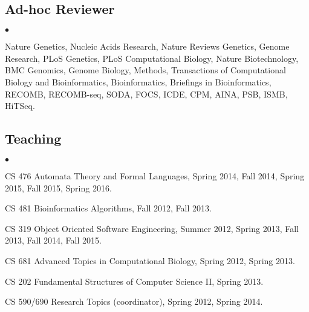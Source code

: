 \documentclass[margin,line]{res}
\newenvironment{list2}{
  \begin{list}{$\bullet$}{%
      \setlength{\itemsep}{0in}
      \setlength{\parsep}{0in} \setlength{\parskip}{0in}
      \setlength{\topsep}{0in} \setlength{\partopsep}{0in} 
      \setlength{\leftmargin}{0.2in}}}{\end{list}}
\begin{document}
\begin{resume}
\vspace{-0.6cm}
\subsection{\small \sc Ad-hoc Reviewer}
\begin{list2}
\item
  Nature Genetics, Nucleic Acids Research, Nature Reviews Genetics, Genome Research, PLoS Genetics, PLoS Computational Biology, 
  Nature Biotechnology, BMC Genomics, Genome Biology, Methods, Transactions of Computational Biology and Bioinformatics,
  Bioinformatics, Briefings in Bioinformatics, RECOMB, RECOMB-seq, SODA, FOCS, ICDE, CPM, AINA, PSB, ISMB, HiTSeq.
\end{list2}


\vspace{-0.6cm}
\subsection{\small \sc Teaching}
\begin{list2}
  \item CS 476 Automata Theory and Formal Languages, Spring 2014, Fall 2014, Spring 2015, Fall 2015, Spring 2016.
  \item CS 481 Bioinformatics Algorithms, Fall 2012, Fall 2013.
  \item CS 319 Object Oriented Software Engineering, Summer 2012, Spring 2013, Fall 2013, Fall 2014, Fall 2015.
  \item CS 681 Advanced Topics in Computational Biology, Spring 2012, Spring 2013.
  \item CS 202 Fundamental Structures of Computer Science II, Spring 2013.
  \item CS 590/690 Research Topics (coordinator), Spring 2012, Spring 2014.
\end{list2}




\vspace{-0.6cm}

\end{resume}
\end{document}
